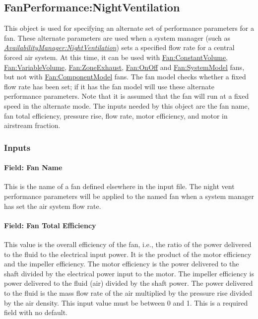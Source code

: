 \subsection{FanPerformance:NightVentilation}\label{fanperformancenightventilation}

This object is used for specifying an alternate set of performance parameters for a fan.
These alternate parameters are used when a system manager (such as \emph{\hyperref[availabilitymanagernightventilation]{AvailabilityManager:NightVentilation}}) sets a specified flow rate for a central forced air system.
At this time, it can be used with \hyperref[fanconstantvolume]{Fan:ConstantVolume}, \hyperref[fanvariablevolume]{Fan:VariableVolume}, \hyperref[fanzoneexhaust]{Fan:ZoneExhaust}, \hyperref[fanonoff]{Fan:OnOff} and \hyperref[fansystemmodel]{Fan:SystemModel} fans, but not with \hyperref[fancomponentmodel]{Fan:ComponentModel} fans.
The fan model checks whether a fixed flow rate has been set; if it has the fan model will use these alternate performance parameters. Note that it is assumed that the fan will run at a fixed speed in the alternate mode. The inputs needed by this object are the fan name, fan total efficiency, pressure rise, flow rate, motor efficiency, and motor in airstream fraction.

\subsubsection{Inputs}\label{inputs-4-013}

\paragraph{Field: Fan Name}\label{field-fan-name-001}

This is the name of a fan defined elsewhere in the input file. The night vent performance parameters will be applied to the named fan when a system manager has set the air system flow rate.

\paragraph{Field: Fan Total Efficiency}\label{field-fan-total-efficiency-4}

This value is the overall efficiency of the fan, i.e., the ratio of the power delivered to the fluid to the electrical input power. It is the product of the motor efficiency and the impeller efficiency. The motor efficiency is the power delivered to the shaft divided by the electrical power input to the motor. The impeller efficiency is power delivered to the fluid (air) divided by the shaft power. The power delivered to the fluid is the mass flow rate of the air multiplied by the pressure rise divided by the air density. This input value must be between 0 and 1. This is a required field with no default.

